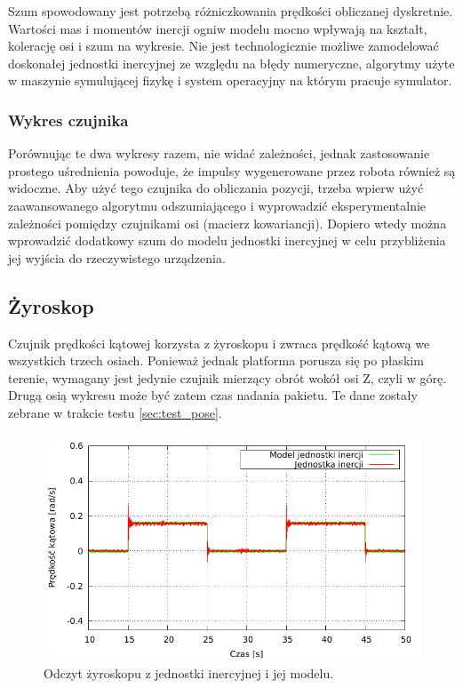 			Szum spowodowany jest potrzebą różniczkowania prędkości obliczanej dyskretnie. Wartości mas i momentów inercji ogniw modelu mocno wpływają na kształt, kolerację
			osi i szum na wykresie. Nie jest technologicznie możliwe zamodelować doskonałej jednostki inercyjnej ze względu na błędy numeryczne, algorytmy użyte w maszynie
			symulującej fizykę i system operacyjny na którym pracuje symulator.
			
		\subsubsection{Wykres czujnika}
			Porównując te dwa wykresy razem, nie widać zależności, jednak zastosowanie prostego uśrednienia powoduje, że impulsy wygenerowane przez robota również są widoczne.
			Aby użyć tego czujnika do obliczania pozycji, trzeba wpierw użyć zaawansowanego algorytmu odszumiającego i wyprowadzić eksperymentalnie zależności pomiędzy czujnikami
			osi (macierz kowariancji).
			Dopiero wtedy można wprowadzić dodatkowy szum do modelu jednostki inercyjnej w celu przybliżenia jej wyjścia do rzeczywistego urządzenia.

			
\subsection{Żyroskop}
		\label{sec:test_ang}
		Czujnik prędkości kątowej korzysta z żyroskopu i zwraca prędkość kątową we wszystkich trzech osiach.
		Ponieważ jednak platforma porusza się po płaskim terenie, wymagany jest jedynie czujnik mierzący obrót wokół osi Z, czyli w górę.
		Drugą osią wykresu może być zatem czas nadania pakietu. Te dane zostały zebrane w trakcie testu \ref{sec:test_pose}.
		
		\begin{figure}[H]
			\centering
			\includegraphics[width=\textwidth]{plots/wewucho_ang.pdf}
			\caption{Odczyt żyroskopu z jednostki inercyjnej i jej modelu.}
			\label{plot:ang}
		\end{figure}
		
